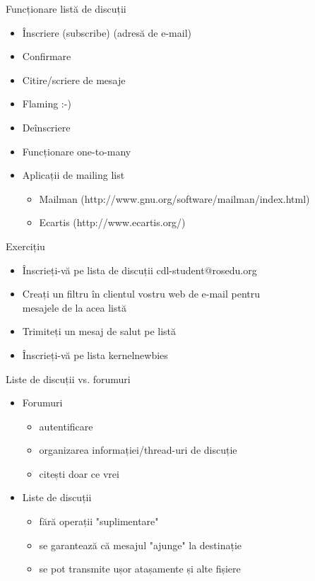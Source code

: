 \documentclass{beamer}
\begin{document}
    \begin{frame}{Funcționare listă de discuții}
    \begin{itemize}
    \setlength{\itemsep}{0.5cm}
    \item Înscriere (subscribe) (adresă de e-mail)
    \item Confirmare
    \item Citire/scriere de mesaje
    \item Flaming :-)
    \item Deînscriere
    \item Funcționare one-to-many
    \item Aplicații de mailing list
        \begin{itemize}
            \item Mailman (http://www.gnu.org/software/mailman/index.html)
            \item Ecartis (http://www.ecartis.org/)
        \end{itemize}
    \end{itemize}
    \end{frame}

    \begin{frame}{Exercițiu}
    \begin{itemize}
    \setlength{\itemsep}{0.5cm}
    \item Înscrieți-vă pe lista de discuții cdl-student@rosedu.org
    \item Creați un filtru în clientul vostru web de e-mail pentru \\
        mesajele de la acea listă
    \item Trimiteți un mesaj de salut pe listă
    \item Înscrieți-vă pe lista kernelnewbies
    \end{itemize}
    \end{frame}

    \begin{frame}{Liste de discuții vs. forumuri}
    \begin{itemize}
    \setlength{\itemsep}{0.5cm}
    \item Forumuri
        \begin{itemize}
        \item autentificare
        \item organizarea informației/thread-uri de discuție
        \item citești doar ce vrei
        \end{itemize}
    \item Liste de discuții
        \begin{itemize}
        \item fără operații "suplimentare"
        \item se garantează că mesajul "ajunge" la destinație
        \item se pot transmite ușor atașamente și alte fișiere
        \end{itemize}
    \end{itemize}
    \end{frame}
\end{document}
